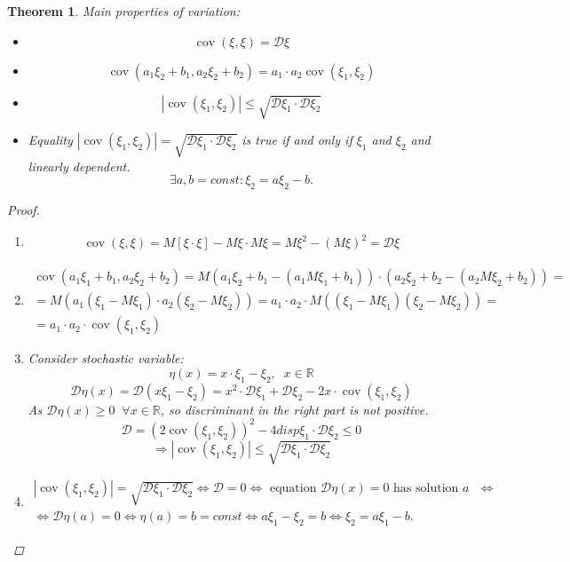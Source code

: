 \documentclass[12pt,letterpaper]{report}
\newtheorem{theorem}{Theorem}
\DeclareMathOperator{\cov}{cov}
\begin{document}
\begin{theorem}
    Main properties of variation:
    \begin{itemize}
        \item[1.] \[ \cov(\xi, \xi) = \mathcal{D}\xi \]
        \item[2.] \[ \cov(a_1 \xi_2 + b_1, a_2 \xi_2 + b_2) = a_1 \cdot a_2 \cov(\xi_1, \xi_2) \]
        \item[3.] \[ |\cov(\xi_1, \xi_2)| \leq \sqrt{\mathcal{D}\xi_1\cdot \mathcal{D}\xi_2} \]
        \item[4.] Equality $|\cov(\xi_1, \xi_2)| = \sqrt{\mathcal{D}\xi_1 \cdot \mathcal{D}\xi_2}$ is true if and only if $\xi_1$ and $\xi_2$ and linearly dependent.
            \[
                \exists a, b = const : \xi_2 = a \xi_2 - b
            .\] 
    \end{itemize}
    \begin{proof}
        \begin{enumerate}
            \item
                \begin{gather*}
                    \cov(\xi, \xi) = M[\xi \cdot \xi] - M\xi \cdot M\xi = M\xi^2 - (M\xi)^2 = \mathcal{D}\xi
                \end{gather*}
            \item
                \begin{gather*}
                    \cov(a_1\xi_1 + b_1, a_2\xi_2 + b_2) = M(a_1\xi_2 + b_1 - (a_1 M\xi_1 + b_1)) \cdot (a_2\xi_2+b_2-(a_2M\xi_2+b_2)) = \\
                    = M(a_1(\xi_1-M\xi_1)\cdot a_2(\xi_2 -M\xi_2)) = 
                    a_1\cdot a_2 \cdot M((\xi_1 -M\xi_1)(\xi_2 - M\xi_2)) = \\
                    = a_1 \cdot a_2\cdot \cov(\xi_1, \xi_2)
                \end{gather*}
            \item Consider stochastic variable:
                \[ \eta(x) = x\cdot \xi_1 - \xi_2, \;\; x\in \mathbb{R} \]
                \[ \mathcal{D}\eta(x) = \mathcal{D}(x\xi_1 - \xi_2) = x^2 \cdot \mathcal{D}\xi_1 + \mathcal{D}\xi_2 - 2x \cdot \cov(\xi_1,  \xi_2) \]
                As $\mathcal{D}\eta(x) \geq 0 \;\; \forall x \in \mathbb{R}$, so discriminant in the right part is not positive.
                \[ \mathcal{D} = (2\cov(\xi_1, \xi_2))^2 - 4disp\xi_1\cdot \mathcal{D}\xi_2 \leq 0 \]
                \[  \Rightarrow |\cov(\xi_1, \xi_2)| \leq \sqrt{\mathcal{D}\xi_1 \cdot \mathcal{D}\xi_2} \]
            \item 
                \begin{gather*}
                    |\cov(\xi_1, \xi_2)| = \sqrt{\mathcal{D}\xi_1\cdot \mathcal{D}\xi_2} \iff \mathcal{D} = 0 \iff \text{ equation $\mathcal{D}\eta(x)=0$ has solution $a$ } \iff \\
                    \iff \mathcal{D}\eta(a) = 0 \iff \eta(a) = b = const \iff
                    a\xi_1 - \xi_2 = b \iff \xi_2 = a\xi_1 - b.
                \end{gather*}
        \end{enumerate}
    \end{proof}


\end{theorem}
\end{document}
